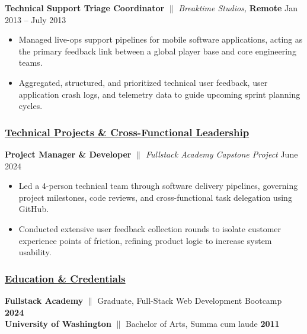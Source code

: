 \documentclass[a4paper,10pt]{article}
\begin{document}
\vspace{1.5mm}
{\textbf{Technical Support Triage Coordinator} {$\parallel$} \textit{Breaktime Studios,}  \textbf{Remote} \hfill {Jan 2013 – July 2013}}
\begin{itemize}
      \item Managed live-ops support pipelines for mobile software applications, acting as the primary feedback link between a global player base and core engineering teams.
      \item Aggregated, structured, and prioritized technical user feedback, user application crash logs, and telemetry data to guide upcoming sprint planning cycles.
\end{itemize}

\subsubsection{\underline{Technical Projects \& Cross-Functional Leadership}}

{\textbf{Project Manager \& Developer} \textit{$\parallel$ Fullstack Academy Capstone Project} \hfill {June 2024}}
\begin{itemize}
      \item Led a 4-person technical team through software delivery pipelines, governing project milestones, code reviews, and cross-functional task delegation using GitHub.
      \item Conducted extensive user feedback collection rounds to isolate customer experience points of friction, refining product logic to increase system usability.
\end{itemize}

\subsubsection{\underline{Education \& Credentials}}
\textbf{Fullstack Academy} {$\parallel$} Graduate, Full-Stack Web Development Bootcamp \hfill \textbf{2024} \\
\textbf{University of Washington} {$\parallel$} Bachelor of Arts, Summa cum laude \hfill \textbf{2011}
\end{document}
